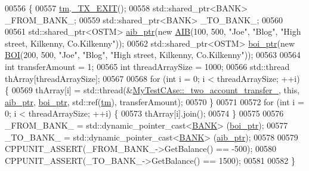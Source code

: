 \begin{DoxyCode}
00556                                                         \{
00557     \hyperlink{class_my_test_c_ase_a422e6e5d4ddedea384be96031c89b72b_a422e6e5d4ddedea384be96031c89b72b}{tm}.\hyperlink{class_t_m_a5e2d1127f2429f2f524d25f430eade06_a5e2d1127f2429f2f524d25f430eade06}{\_TX\_EXIT}();
00558     std::shared\_ptr<BANK> \_FROM\_BANK\_;
00559     std::shared\_ptr<BANK> \_TO\_BANK\_;
00560     
00561     std::shared\_ptr<OSTM> \hyperlink{class_my_test_c_ase_adad50e8278b64aa0321000b528e5362c_adad50e8278b64aa0321000b528e5362c}{aib\_ptr}(\textcolor{keyword}{new} \hyperlink{class_a_i_b}{AIB}(100, 500, \textcolor{stringliteral}{"Joe"}, \textcolor{stringliteral}{"Blog"}, \textcolor{stringliteral}{"High street, Kilkenny,
       Co.Kilkenny"}));
00562     std::shared\_ptr<OSTM> \hyperlink{class_my_test_c_ase_a5554de9e3e6393a89c66c036c529720b_a5554de9e3e6393a89c66c036c529720b}{boi\_ptr}(\textcolor{keyword}{new} \hyperlink{class_b_o_i}{BOI}(200, 500, \textcolor{stringliteral}{"Joe"}, \textcolor{stringliteral}{"Blog"}, \textcolor{stringliteral}{"High street, Kilkenny,
       Co.Kilkenny"}));
00563     
00564     \textcolor{keywordtype}{int} transferAmount = 1;
00565     \textcolor{keywordtype}{int} threadArraySize = 1000; 
00566     std::thread thArray[threadArraySize];
00567 
00568     \textcolor{keywordflow}{for} (\textcolor{keywordtype}{int} i = 0; i < threadArraySize; ++i) \{
00569         thArray[i] = std::thread(&\hyperlink{class_my_test_c_ase_af0cc86421d281cc4a583a394ae86dbdd_af0cc86421d281cc4a583a394ae86dbdd}{MyTestCAse::\_two\_account\_transfer\_}, \textcolor{keyword}{
      this}, \hyperlink{class_my_test_c_ase_adad50e8278b64aa0321000b528e5362c_adad50e8278b64aa0321000b528e5362c}{aib\_ptr}, \hyperlink{class_my_test_c_ase_a5554de9e3e6393a89c66c036c529720b_a5554de9e3e6393a89c66c036c529720b}{boi\_ptr}, std::ref(\hyperlink{class_my_test_c_ase_a422e6e5d4ddedea384be96031c89b72b_a422e6e5d4ddedea384be96031c89b72b}{tm}), transferAmount);
00570     \}
00571     
00572     \textcolor{keywordflow}{for} (\textcolor{keywordtype}{int} i = 0; i < threadArraySize; ++i) \{
00573         thArray[i].join();
00574     \}
00575     
00576     \_FROM\_BANK\_ = std::dynamic\_pointer\_cast<\hyperlink{class_b_a_n_k}{BANK}> (\hyperlink{class_my_test_c_ase_a5554de9e3e6393a89c66c036c529720b_a5554de9e3e6393a89c66c036c529720b}{boi\_ptr});
00577     \_TO\_BANK\_ = std::dynamic\_pointer\_cast<\hyperlink{class_b_a_n_k}{BANK}> (\hyperlink{class_my_test_c_ase_adad50e8278b64aa0321000b528e5362c_adad50e8278b64aa0321000b528e5362c}{aib\_ptr});
00578 
00579     CPPUNIT\_ASSERT(\_FROM\_BANK\_->GetBalance() == -500);
00580     CPPUNIT\_ASSERT(\_TO\_BANK\_->GetBalance() == 1500);
00581     
00582 \}
\end{DoxyCode}



